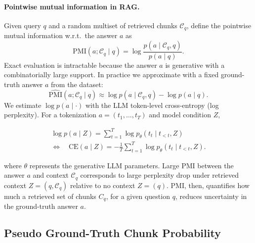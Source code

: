 \documentclass{article}
\theoremstyle{plain}
\theoremstyle{definition}
\theoremstyle{remark}
\begin{document}
\paragraph{Pointwise mutual information in RAG.}
Given query $q$ and a random multiset of retrieved chunks $\mathcal{C}_q$, define the pointwise mutual information w.r.t.\ the answer $a$ as
\begin{equation}
\mathrm{PMI}(a;\mathcal{C}_q\mid q)=\log\frac{p(a\mid \mathcal{C}_q,q)}{p(a\mid q)}.
\end{equation}
Exact evaluation is intractable because the answer $a$ is generative with a combinatorially large support. In practice we approximate with a fixed ground-truth answer $a$ from the dataset:
\begin{equation}
\widehat{\mathrm{PMI}}(a;\mathcal{C}_q\mid q)\approx \log p(a\mid \mathcal{C}_q,q)-\log p(a\mid q).
\end{equation}
We estimate $\log p(a\mid \cdot)$ with the LLM token-level cross-entropy (log perplexity). For a tokenization $a=(t_1,\dots,t_T)$ and model condition $Z$,
\begin{small}
\begin{multline}
\log p(a\mid Z)=\sum_{t=1}^{T}\log p_\theta(t_t\mid t_{<t},Z) \\ 
\Longleftrightarrow\quad
\mathrm{CE}(a\mid Z)=-\frac{1}{T}\sum_{t=1}^{T}\log p_\theta(t_t\mid t_{<t},Z).
\end{multline}
\end{small}

where $\theta$ represents the generative LLM parameters. Large PMI between the answer $a$ and context $\mathcal{C}_q$ corresponds to large perplexity drop under retrieved context $Z=(q,\mathcal{C}_q)$ relative to no context $Z=(q)$. PMI, then, quantifies how much a retrieved set of chunks $C_q$, for a given question $q$, reduces uncertainty in the ground-truth answer $a$.
\subsection{Pseudo Ground-Truth Chunk Probability}
\end{document}
